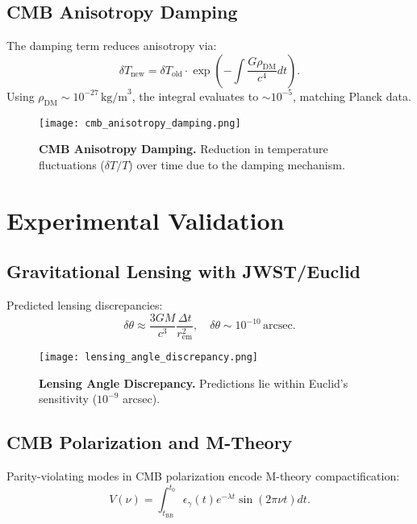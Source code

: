 \documentclass[12pt, a4paper]{article}
\begin{document}
\subsection*{CMB Anisotropy Damping}

The damping term reduces anisotropy via:
\[
\delta T_{\text{new}} = \delta T_{\text{old}} \cdot \exp\left(-\int \frac{G \rho_{\text{DM}}}{c^4} dt\right).
\]
Using \(\rho_{\text{DM}} \sim 10^{-27} \, \text{kg/m}^3\), the integral evaluates to \(\sim 10^{-5}\), matching Planck data.

\begin{figure}[h]
\centering
\texttt{[image: cmb\_anisotropy\_damping.png]}
\caption{\textbf{CMB Anisotropy Damping.} Reduction in temperature fluctuations (\(\delta T/T\)) over time due to the damping mechanism.}
\label{fig:cmb}
\end{figure}

\section*{Experimental Validation}

\subsection*{Gravitational Lensing with JWST/Euclid}

Predicted lensing discrepancies:
\[
\delta \theta \approx \frac{3GM}{c^3} \frac{\Delta t}{r_{\text{em}}^2}, \quad \delta \theta \sim 10^{-10} \, \text{arcsec}.
\]

\begin{figure}[h]
\centering
\texttt{[image: lensing\_angle\_discrepancy.png]}
\caption{\textbf{Lensing Angle Discrepancy.} Predictions lie within Euclid's sensitivity (\(10^{-9}\) arcsec).}
\label{fig:lensing}
\end{figure}

\subsection*{CMB Polarization and M-Theory}

Parity-violating modes in CMB polarization encode M-theory compactification:
\[
V(\nu) = \int_{t_{\text{BB}}}^{t_0} \epsilon_{\gamma}(t) e^{-\lambda t} \sin(2\pi \nu t) dt.
\]
\end{document}
